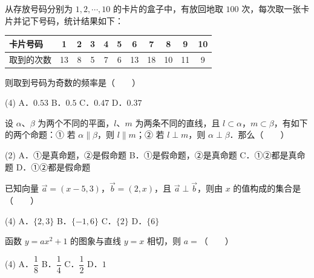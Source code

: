 \begin{question}
从存放号码分别为 $1, 2, \cdots, 10$ 的卡片的盒子中，有放回地取 $100$ 次，每次取一张卡片并记下号码，统计结果如下：

\begin{center}
\begingroup\setlength{\tabcolsep}{4pt}
\begin{tabular}{lcccccccccc}
\toprule
卡片号码 & 1 & 2 & 3 & 4 & 5 & 6 & 7 & 8 & 9 & 10 \\
\midrule
取到的次数 & 13 & 8 & 5 & 7 & 6 & 13 & 18 & 10 & 11 & 9 \\
\bottomrule
\end{tabular}
\endgroup
\end{center}

则取到号码为奇数的频率是\mbox{（　　）}

\begin{gkopts}(4)
\task A．$0.53$
\task B．$0.5$
\task C．$0.47$
\task D．$0.37$
\end{gkopts}

\end{question}
\begin{question}
设 $\alpha$、$\beta$ 为两个不同的平面，$l$、$m$ 为两条不同的直线，且 $l \subset \alpha$，$m \subset \beta$，有如下的两个命题：① 若 $\alpha \parallel \beta$，则 $l \parallel m$；② 若 $l \perp m$，则 $\alpha \perp \beta$．那么\mbox{（　　）}

\begin{gkopts}(2)
\task A．①是真命题，②是假命题
\task B．①是假命题，②是真命题
\task C．①②都是真命题
\task D．①②都是假命题
\end{gkopts}

\end{question}
\begin{question}
已知向量 $\vec{a} = (x - 5, 3)$，$\vec{b} = (2, x)$，且 $\vec{a} \perp \vec{b}$，则由 $x$ 的值构成的集合是\mbox{（　　）}

\begin{gkopts}(4)
\task A．$\{2, 3\}$
\task B．$\{-1, 6\}$
\task C．$\{2\}$
\task D．$\{6\}$
\end{gkopts}

\end{question}
\begin{question}
函数 $y = ax^2 + 1$ 的图象与直线 $y = x$ 相切，则 $a =$\mbox{（　　）}

\begin{gkopts}(4)
\task A．$\dfrac{1}{8}$
\task B．$\dfrac{1}{4}$
\task C．$\dfrac{1}{2}$
\task D．$1$
\end{gkopts}

\Needspace{0.4\textheight}
\end{question}
